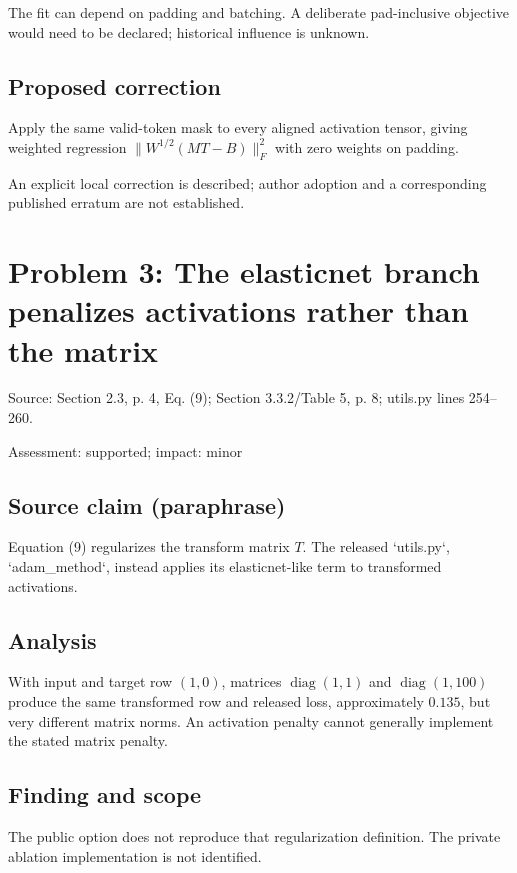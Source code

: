 \documentclass[11pt]{article}
\begin{document}
The fit can depend on padding and batching. A deliberate pad-inclusive objective would need to be declared; historical influence is unknown.

\subsection*{Proposed correction}

Apply the same valid-token mask to every aligned activation tensor, giving weighted regression \(\|W^{1/2}(MT-B)\|_F^2\) with zero weights on padding.

An explicit local correction is described; author adoption and a corresponding published erratum are not established.

\section*{Problem 3: The elasticnet branch penalizes activations rather than the matrix}

Source: Section 2.3, p. 4, Eq. (9); Section 3.3.2/Table 5, p. 8; utils.py lines 254–260.

Assessment: supported; impact: minor

\subsection*{Source claim (paraphrase)}

Equation (9) regularizes the transform matrix \(T\). The released `utils.py`, `adam\_method`, instead applies its elasticnet-like term to transformed activations.

\subsection*{Analysis}

With input and target row \((1,0)\), matrices \(\operatorname{diag}(1,1)\) and \(\operatorname{diag}(1,100)\) produce the same transformed row and released loss, approximately \(0.135\), but very different matrix norms. An activation penalty cannot generally implement the stated matrix penalty.

\subsection*{Finding and scope}

The public option does not reproduce that regularization definition. The private ablation implementation is not identified.
\end{document}
